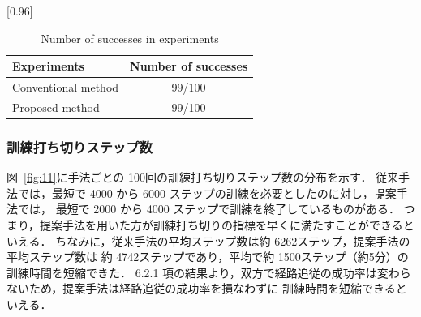 \documentclass{jarticle}
\renewcommand{\figurename}{図~}
\newcommand{\figref}[1]{\figurename\ref{#1}}
\begin{document}
\begin{table}[h!]
  \centering
  \caption{Number of successes in experiments}
  \label{table:2}
    \scalebox{0.96}[0.96] {
    \begin{tabular}{|l||c|}
      \hline
      Experiments & Number of successes \\
      \hline\hline
      Conventional method & 99/100 \\
      \hline
      Proposed method & 99/100\\
      \hline 
    \end{tabular} }
\end{table}

\subsubsection{訓練打ち切りステップ数}
\figref{fig:11}に手法ごとの 100回の訓練打ち切りステップ数の分布を示す．
従来手法では，最短で 4000 から 6000 ステップの訓練を必要としたのに対し，提案手法では，
最短で 2000 から 4000 ステップで訓練を終了しているものがある．
つまり，提案手法を用いた方が訓練打ち切りの指標を早くに満たすことができるといえる．
ちなみに，従来手法の平均ステップ数は約 6262ステップ，提案手法の平均ステップ数は
約 4742ステップであり，平均で約 1500ステップ（約5分）の訓練時間を短縮できた．
6.2.1 項の結果より，双方で経路追従の成功率は変わらないため，提案手法は経路追従の成功率を損なわずに
訓練時間を短縮できるといえる．
\end{document}
